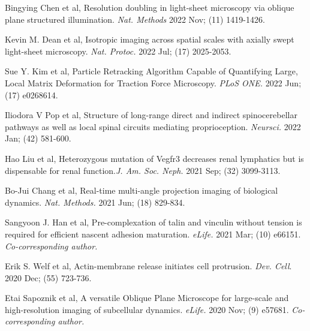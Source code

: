 \begin{etaremune}
\item Bingying Chen et al, Resolution doubling in light-sheet microscopy via oblique plane structured illumination. {\it Nat. Methods} 2022 Nov; (11) 1419-1426.

\item Kevin M. Dean et al, Isotropic imaging across spatial scales with axially swept light-sheet microscopy. {\it Nat. Protoc.} 2022 Jul; (17) 2025-2053.

\item Sue Y. Kim et al, Particle Retracking Algorithm Capable of Quantifying Large, Local Matrix Deformation for Traction Force Microscopy. {\it PLoS ONE.} 2022 Jun; (17) e0268614. 

\item Iliodora V Pop et al, Structure of long-range direct and indirect spinocerebellar pathways as well as local spinal circuits mediating proprioception. {\it Neursci.} 2022 Jan; (42) 581-600.

\item Hao Liu et al, Heterozygous mutation of Vegfr3 decreases renal lymphatics but is dispensable for renal function.{\it J. Am. Soc. Neph.} 2021 Sep; (32) 3099-3113.

\item Bo-Jui Chang et al, Real-time multi-angle projection imaging of biological dynamics. {\it Nat. Methods.} 2021 Jun; (18) 829-834.

\item Sangyoon J. Han et al, Pre-complexation of talin and vinculin without tension is required for efficient nascent adhesion maturation. {\it eLife.} 2021 Mar; (10) e66151. {\it Co-corresponding author.}

\item Erik S. Welf et al, Actin-membrane release initiates cell protrusion.  {\it Dev. Cell}. 2020 Dec; (55) 723-736.

\item  Etai Sapoznik et al, A versatile Oblique Plane Microscope for large-scale and high-resolution imaging of subcellular dynamics.  {\it eLife.} 2020 Nov; (9) e57681. {\it Co-corresponding author.}


\end{etaremune}

